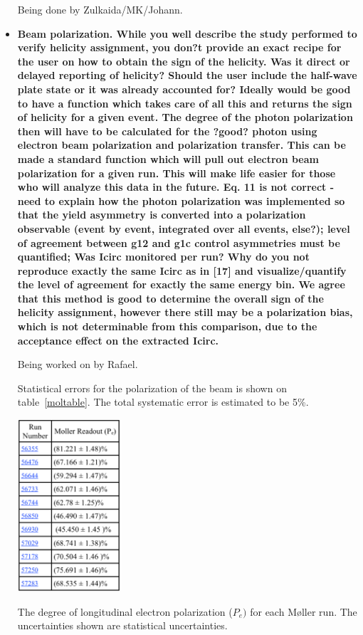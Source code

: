 \documentclass[ 12 pt]{article}
\begin{document}
\begin{itemize}
Being done by Zulkaida/MK/Johann.


\item \textbf{Beam polarization. While you well describe the study performed to verify
helicity assignment, you don?t provide an exact recipe for the user on how to
obtain the sign of the helicity. Was it direct or delayed reporting of helicity?
Should the user include the half-wave plate state or it was already accounted
for? Ideally would be good to have a function which takes care of all this and
returns the sign of helicity for a given event. The degree of the photon
polarization then will have to be calculated for the ?good? photon using
electron beam polarization and polarization transfer. This can be made a
standard function which will pull out electron beam polarization for a given
run. This will make life easier for those who will analyze this data in the
future. Eq. 11 is not correct - need to explain how the photon polarization
was implemented so that the yield asymmetry is converted into a
polarization observable (event by event, integrated over all events, else?);
level of agreement between g12 and g1c control asymmetries must be
quantified; Was Icirc monitored per run? Why do you not reproduce exactly
the same Icirc as in [17] and visualize/quantify the level of agreement for
exactly the same energy bin. We agree that this method is good to determine
the overall sign of the helicity assignment, however there still may be a
polarization bias, which is not determinable from this comparison, due to the
acceptance effect on the extracted Icirc.}

Being worked on by Rafael.

Statistical errors for the polarization of the beam is shown on table~\ref{moltable}. The total systematic error is estimated to be 5\%.

\begin{table}[htpb]
\begin{center}
 \includegraphics[width=0.3\textwidth]{figures/calib/pol/moltable.eps}
  \caption{The degree of longitudinal electron polarization ($P_e)$ for each M{\o}ller run. The uncertainties shown are statistical uncertainties. }
  \label{moltable}
  \end{center}
\end{table}


\end{itemize}
\end{document}
